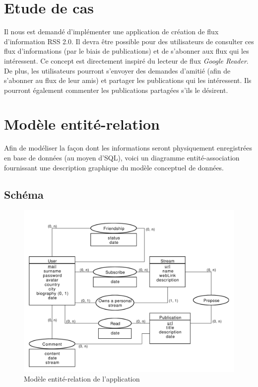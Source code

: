\documentclass[a4paper,10pt]{article}
\begin{document}
\tableofcontents
\pagebreak

\section{Etude de cas}

Il nous est demandé d'implémenter une application de création de flux d'information RSS 2.0. Il devra être possible pour des utilisateurs de consulter ces flux d'informations (par le biais de publications) et de s'abonner aux flux qui les intéressent. Ce concept est directement inspiré du lecteur de flux \textit{Google Reader}. De plus, les utilisateurs pourront s'envoyer des demandes d'amitié (afin de s'abonner au flux de leur amis) et partager les publications qui les intéressent. Ils pourront également commenter les publications partagées s'ils le désirent. 

\section{Modèle entité-relation}

Afin de modéliser la façon dont les informations seront physiquement enregistrées en base de données (au moyen d'SQL), voici un diagramme entité-association fournissant une description graphique du modèle conceptuel de données.

\subsection{Schéma}

	\begin{figure}[h!]
	    \centering
	    \includegraphics[width=15cm]{Entite-Relation-2.pdf}
	    \caption{Modèle entité-relation de l'application}
	    \label{fig:Entite-Relation}
	\end{figure}
\end{document}
